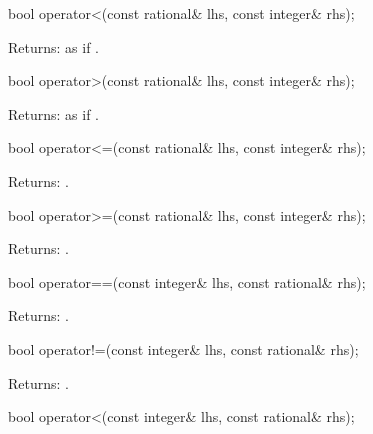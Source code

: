 \begin{itemdecl}
bool operator<(const rational& lhs, const integer& rhs);
\end{itemdecl}

\begin{itemdescr}
Returns: as if .
\end{itemdescr}

\begin{itemdecl}
bool operator>(const rational& lhs, const integer& rhs);
\end{itemdecl}

\begin{itemdescr}
Returns: as if .
\end{itemdescr}

\begin{itemdecl}
bool operator<=(const rational& lhs, const integer& rhs);
\end{itemdecl}

\begin{itemdescr}
Returns: .
\end{itemdescr}

\begin{itemdecl}
bool operator>=(const rational& lhs, const integer& rhs);
\end{itemdecl}

\begin{itemdescr}
Returns: .
\end{itemdescr}

\begin{itemdecl}
bool operator==(const integer& lhs, const rational& rhs);
\end{itemdecl}

\begin{itemdescr}
Returns: .
\end{itemdescr}

\begin{itemdecl}
bool operator!=(const integer& lhs, const rational& rhs);
\end{itemdecl}

\begin{itemdescr}
Returns: .
\end{itemdescr}

\begin{itemdecl}
bool operator<(const integer& lhs, const rational& rhs);
\end{itemdecl}

